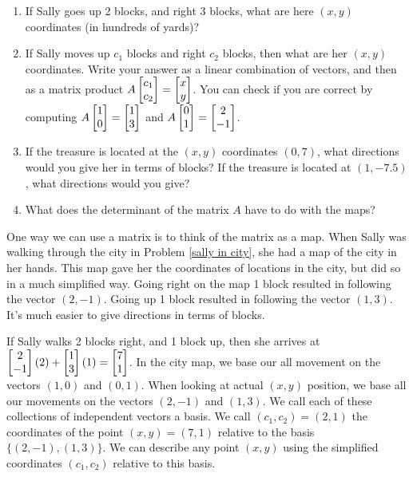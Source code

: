 \begin{problem}
\begin{enumerate}
 \item If Sally goes up 2 blocks, and right 3 blocks, what are here $(x,y)$ coordinates (in hundreds of yards)?
 \item If Sally moves up $c_1$ blocks and right $c_2$ blocks, then what are her $(x,y)$ coordinates. Write your answer as a linear combination of vectors, and then as a matrix product $A\begin{bmatrix} c_1\\c_2 \end{bmatrix}=\begin{bmatrix} x\\y \end{bmatrix}$. You can check if you are correct by computing $A\begin{bmatrix} 1\\0 \end{bmatrix}=\begin{bmatrix} 1\\3 \end{bmatrix}$ and $A\begin{bmatrix} 0\\1 \end{bmatrix}=\begin{bmatrix} 2\\-1 \end{bmatrix}$. 
 \item If the treasure is located at the $(x,y)$ coordinates $(0,7)$, what directions would you give her in terms of blocks? If the treasure is located at $(1,-7.5)$, what directions would you give?
 \item What does the determinant of the matrix $A$ have to do with the maps?
\end{enumerate}

\end{problem}


One way we can use a matrix is to think of the matrix as a map. When Sally was walking through the city in Problem \ref{sally in city}, she had a map of the city in her hands.  This map gave her the coordinates of locations in the city, but did so in a much simplified way. Going right on the map 1 block resulted in following the vector $(2,-1)$.  Going up 1 block resulted in following the vector $(1,3)$. It's much easier to give directions in terms of blocks.  

If Sally walks 2 blocks right, and 1 block up, then she arrives at $\begin{bmatrix} 2\\-1 \end{bmatrix}(2)+\begin{bmatrix} 1\\3 \end{bmatrix}(1) = \begin{bmatrix} 7\\1 \end{bmatrix}$. In the city map, we base our all movement on the vectors $(1,0)$ and $(0,1)$. When looking at actual $(x,y)$ position, we base all our movements on the vectors $(2,-1)$ and $(1,3)$. We call each of these collections of independent vectors a basis.  We call $(c_1,c_2)=(2,1)$ the coordinates of the point $(x,y)=(7,1)$ relative to the basis $\{(2,-1),(1,3)\}$. 
We can describe any point $(x,y)$ using the simplified coordinates $(c_1,c_2)$ relative to this basis.


